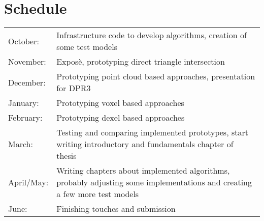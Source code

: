 
\section{Schedule}

\begin{tabularx}{\textwidth}{l X}
	October: & Infrastructure code to develop algorithms, creation of some test models \\
	
	November: & Expos\`e, prototyping direct triangle intersection \\
	
	December: & Prototyping point cloud based approaches, presentation for DPR3 \\
	
	January: & Prototyping voxel based approaches \\
	
	February: & Prototyping dexel based approaches \\
	
	March: & Testing and comparing implemented prototypes, start writing introductory and fundamentals chapter of thesis \\
	
	April/May: & Writing chapters about implemented algorithms, probably adjusting some implementations and creating a few more test models \\
	
	June: & Finishing touches and submission \\
\end{tabularx}

